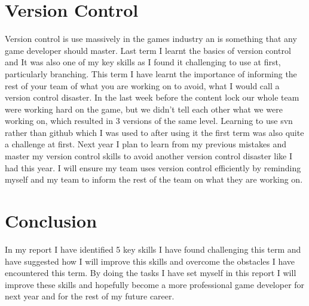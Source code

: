 \documentclass{scrartcl}
\begin{document}
\section{Version Control}
Version control is use massively in the games industry an is something that any game developer should master. Last term I learnt the basics of version control and It was also one of my key skills as I found it challenging to use at first, particularly branching. This term I have learnt the importance of informing the rest of your team of what you are working on to avoid, what I would call a version control disaster. In the last week before the content lock our whole team were working hard on the game, but we didn't tell each other what we were working on, which resulted in 3 versions of the same level. Learning to use svn rather than github which I was used to after using it the first term was also quite a challenge at first. Next year I plan to learn from my previous mistakes and master my version control skills to avoid another version control disaster like I had this year. I will ensure my team uses version control efficiently by reminding myself and my team to inform the rest of the team on what they are working on. 

\section*{Conclusion}
In my report I have identified 5 key skills I have found challenging this term and have suggested how I will improve this skills and overcome the obstacles I have encountered this term. By doing the tasks I have set myself in this report I will improve these skills and hopefully become a more professional game developer for next year and for the rest of my future career. 



\end{document}
